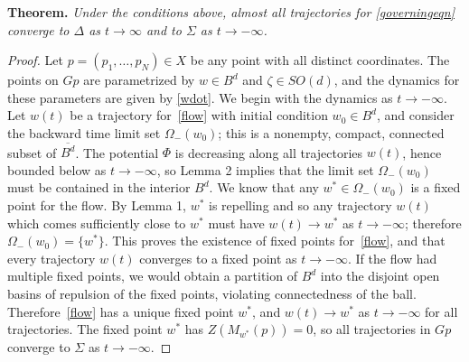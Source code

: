 \documentclass[%
 aip,
 amsmath,amssymb,
 reprint,%
]{revtex4-1}
\newtheorem{theorem}{Theorem}
\begin{document}
\noindent \textbf{Theorem.} \emph{Under the conditions above, almost all trajectories for \eqref{governingeqn} converge to $\Delta$ as $t \to \infty$ and to $\Sigma$ as $t \to -\infty$.}
\begin{proof}
Let $p = (p_1, \dots, p_N) \in X$ be any point with all distinct coordinates.   The points on $Gp$ are parametrized by $w \in B^d$ and $\zeta \in SO(d)$, and the dynamics for these parameters are given by \eqref{wdot}. 
We begin with the dynamics as $t \to -\infty$.  Let $w(t)$ be a trajectory for~\eqref{flow} with initial condition $w_0 \in B^d$, and consider the backward time limit set $\Omega_-(w_0)$; this is a nonempty, compact, connected subset of $\overline{B^d}$.  The potential $\Phi$ is decreasing along all trajectories $w(t)$, hence bounded below as $t \to - \infty$, so Lemma 2 implies that the limit set $\Omega_-(w_0)$ must be contained in the interior $B^d$.  We know that any  $w^\ast \in \Omega_-(w_0)$ is a fixed point for the flow.    By Lemma 1, $w^\ast$ is repelling and so any trajectory $w(t)$ which comes sufficiently close to $w^\ast$ must have $w(t) \to w^\ast$ as $t \to -\infty$; therefore $\Omega_-(w_0) = \{w^\ast \}$.  This proves the existence of fixed points for~\eqref{flow}, and that every trajectory $w(t)$ converges to a fixed point as $t \to -\infty$.  If the flow had multiple fixed points, we would obtain a partition of $B^d$ into the disjoint open basins of repulsion of the fixed points, violating connectedness of the ball.  Therefore~\eqref{flow} has a unique fixed point $w^\ast$, and $w(t) \to w^\ast$ as $t \to -\infty$ for all trajectories.  The fixed point $w^\ast$ has $Z(M_{w^\ast}(p)) = 0$, so all trajectories in $Gp$ converge to $\Sigma$ as $t \to -\infty$.


\end{proof}
\end{document}
